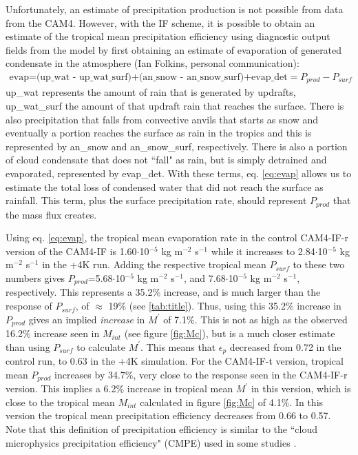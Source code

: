 \documentclass[letterpaper,12pt,titlepage,oneside,final]{book}
\begin{document}
Unfortunately, an estimate of precipitation production is not possible from data from the CAM4. However, with the IF scheme, it is possible to obtain an estimate of the tropical mean precipitation efficiency using diagnostic output fields from the model by first obtaining an estimate of evaporation of generated condensate in the atmosphere (Ian Folkins, personal communication):
\begin{align}\label{eq:evap}
\text{evap=(up\_wat - up\_wat\_surf)+(an\_snow - an\_snow\_surf)+evap\_det}=P_{prod}-P_{surf}
\end{align}
up\_wat represents the amount of rain that is generated by updrafts, up\_wat\_surf the amount of that updraft rain that reaches the surface. There is also precipitation that falls from convective anvils that starts as snow and eventually a portion reaches the surface as rain in the tropics and this is represented by an\_snow and an\_snow\_surf, respectively. There is also a portion of cloud condensate that does not ``fall" as rain, but is simply detrained and evaporated, represented by evap\_det. With these terms, eq. \ref{eq:evap} allows us to estimate the total loss of condensed water that did not reach the surface as rainfall. This term, plus the surface precipitation rate, should represent $P_{prod}$ that the mass flux creates. 

Using eq. \ref{eq:evap}, the tropical mean evaporation rate in the control CAM4-IF-r version of the CAM4-IF is 1.60$\cdot$10$^{-5}$ kg m$^{-2}$ s$^{-1}$ while it increases to 2.84$\cdot$10$^{-5}$ kg m$^{-2}$ s$^{-1}$ in the +4K run. Adding the respective tropical mean $P_{surf}$ to these two numbers gives $P_{prod}$=5.68$\cdot$10$^{-5}$ kg m$^{-2}$ s$^{-1}$, and 7.68$\cdot$10$^{-5}$ kg m$^{-2}$ s$^{-1}$, respectively. This represents a 35.2\% increase, and is much larger than the response of $P_{surf}$, of $\approx$ 19\% (see \ref{tab:title}). Thus, using this 35.2\% increase in $P_{prod}$ gives an implied \textit{increase} in $M^{'}$ of 7.1\%. This is not as high as the observed 16.2\% increase seen in $M_{int}$ (see figure \ref{fig:Mc}), but is a much closer estimate than using $P_{surf}$ to calculate $M^{'}$. This means that $\epsilon_{p}$ decreased from 0.72 in the control run, to 0.63 in the +4K simulation. For the CAM4-IF-t version, tropical mean $P_{prod}$ increases by 34.7\%, very close to the response seen in the CAM4-IF-r version. This implies a 6.2\% increase in tropical mean $M^{'}$ in this version, which is close to the tropical mean $M_{int}$ calculated in figure \ref{fig:Mc} of 4.1\%. In this version the tropical mean precipitation efficiency decreases from 0.66 to 0.57. Note that this definition of precipitation efficiency is similar to the ``cloud microphysics precipitation efficiency" (CMPE) used in some studies \citep{schoenberg_ferrier_factors_1996,sui_definition_2007}.
\end{document}
